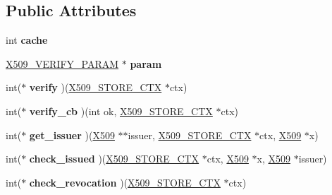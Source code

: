 \subsection*{Public Attributes}
\begin{DoxyCompactItemize}
\item 
\mbox{\label{structx509__store__st_a39100a4cc433d10485ffe0c30c5b88f8}} 
int {\bfseries cache}
\item 
\mbox{\label{structx509__store__st_a988c764019923790356d956bc071c50b}} 
\hyperlink{structX509__VERIFY__PARAM__st}{X509\+\_\+\+V\+E\+R\+I\+F\+Y\+\_\+\+P\+A\+R\+AM} $\ast$ {\bfseries param}
\item 
\mbox{\label{structx509__store__st_a942efe26133aadd04d45f30a824644a7}} 
int($\ast$ {\bfseries verify} )(\hyperlink{structx509__store__ctx__st}{X509\+\_\+\+S\+T\+O\+R\+E\+\_\+\+C\+TX} $\ast$ctx)
\item 
\mbox{\label{structx509__store__st_a2babc2b1c606dc4a45bee39bcb2dddad}} 
int($\ast$ {\bfseries verify\+\_\+cb} )(int ok, \hyperlink{structx509__store__ctx__st}{X509\+\_\+\+S\+T\+O\+R\+E\+\_\+\+C\+TX} $\ast$ctx)
\item 
\mbox{\label{structx509__store__st_a1201b752d9780b08579097b6f53f05b6}} 
int($\ast$ {\bfseries get\+\_\+issuer} )(\hyperlink{structx509__st}{X509} $\ast$$\ast$issuer, \hyperlink{structx509__store__ctx__st}{X509\+\_\+\+S\+T\+O\+R\+E\+\_\+\+C\+TX} $\ast$ctx, \hyperlink{structx509__st}{X509} $\ast$x)
\item 
\mbox{\label{structx509__store__st_a28e3031f30d155bfcee3077781875dd5}} 
int($\ast$ {\bfseries check\+\_\+issued} )(\hyperlink{structx509__store__ctx__st}{X509\+\_\+\+S\+T\+O\+R\+E\+\_\+\+C\+TX} $\ast$ctx, \hyperlink{structx509__st}{X509} $\ast$x, \hyperlink{structx509__st}{X509} $\ast$issuer)
\item 
\mbox{\label{structx509__store__st_af48617053d5abd22e6f0bb877a3801d9}} 
int($\ast$ {\bfseries check\+\_\+revocation} )(\hyperlink{structx509__store__ctx__st}{X509\+\_\+\+S\+T\+O\+R\+E\+\_\+\+C\+TX} $\ast$ctx)
\item 
$$
\end{DoxyCompactItemize}
